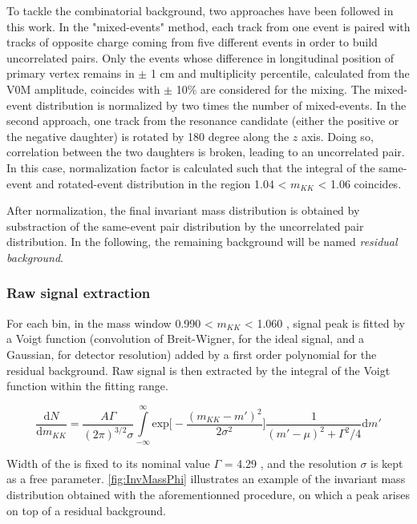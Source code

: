To tackle the combinatorial background, two approaches have been followed in this work. In the "mixed-events" method, each track from one event is paired with tracks of opposite charge coming from five different events in order to build uncorrelated pairs. Only the events whose difference in longitudinal position of primary vertex remains in $\pm$ 1 cm and multiplicity percentile, calculated from the V0M amplitude, coincides with $\pm$ 10\% are considered for the mixing. The mixed-event distribution is normalized by two times the number of mixed-events. In the second approach, one track from the resonance candidate (either the positive or the negative daughter) is rotated by 180 degree along the $z$ axis. Doing so, correlation between the two daughters is broken, leading to an uncorrelated pair. In this case, normalization factor is calculated such that the integral of the same-event and rotated-event distribution in the region 1.04 < $m_{KK}$ < 1.06 \gmass coincides. 

After normalization, the final invariant mass distribution is obtained by substraction of the same-event pair distribution by the uncorrelated pair distribution. In the following, the remaining background will be named \textit{residual background}.

\subsubsection{Raw signal extraction}

For each \pT bin, in the mass window 0.990 < $m_{KK}$ < 1.060 \gmass, signal peak is fitted by a Voigt function (convolution of Breit-Wigner, for the ideal signal, and a Gaussian, for detector resolution) added by a first order polynomial for the residual background. Raw signal is then extracted by the integral of the Voigt function within the fitting range.

\begin{equation}
\frac{\text{d}N}{\text{d}m_{KK}} = \frac{A \Gamma}{(2\pi)^{3/2} \sigma} \int\limits_{-\infty}^{\infty} \text{exp} \big [ -\frac{(m_{KK} - m')^2}{2\sigma^2} \big ] \frac{1}{(m' - \mu)^2 + \Gamma^2/4} \text{d} m'
\end{equation}\label{eq:PhiSignal}

Width of the \rmPhiMes is fixed to its nominal value $\Gamma$ = 4.29 \mev \cite{noauthor_pdglive_nodate}, and the resolution $\sigma$ is kept as a free parameter. \fig \ref{fig:InvMassPhi} illustrates an example of the invariant mass distribution obtained with the aforementionned procedure, on which a \rmPhiMes peak arises on top of a residual background. 

